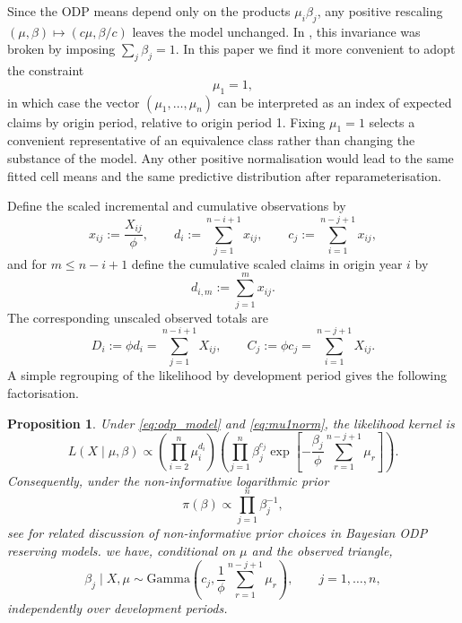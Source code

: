 \documentclass[11pt]{article}
\newtheorem{proposition}[theorem]{Proposition}
\newcommand{\1}{\mathbf{1}}
\newcommand{\GammaD}{\mathrm{Gamma}}
\begin{document}
Since the ODP means depend only on the products $\mu_i\beta_j$, any positive rescaling $(\mu,\beta)\mapsto(c\mu,\beta/c)$ leaves the model unchanged. 
In \citet{Norman2025ODP}, this invariance was broken by imposing $\sum_j{\beta_j}=1$. 
In this paper we find it more convenient to adopt the constraint
\begin{equation}
\mu_1 = 1,
\label{eq:mu1norm}
\end{equation}
in which case the vector $(\mu_1,\dots,\mu_n)$ can be interpreted as an index of expected claims by origin period, relative to origin period 1. 
Fixing $\mu_1=1$ selects a convenient representative of an equivalence class rather than changing the substance of the model. Any other positive normalisation would lead to the same fitted cell means and the same predictive distribution after reparameterisation. 

Define the scaled incremental and cumulative observations by
\begin{equation}
x_{ij} := \frac{X_{ij}}{\phi},
\qquad
d_i := \sum_{j=1}^{n-i+1} x_{ij},
\qquad
c_j := \sum_{i=1}^{n-j+1} x_{ij},
\label{eq:scaled_counts}
\end{equation}
and for $m\le n-i+1$ define the cumulative scaled claims in origin year $i$ by
\begin{equation}
d_{i,m} := \sum_{j=1}^{m} x_{ij}.
\end{equation}
The corresponding unscaled observed totals are
\begin{equation}
D_i:=\phi d_i=\sum_{j=1}^{n-i+1}X_{ij},
\qquad
C_j:=\phi c_j=\sum_{i=1}^{n-j+1}X_{ij}.
\label{eq:unscaled_totals}
\end{equation}
A simple regrouping of the likelihood by development period gives the following factorisation.

\begin{proposition}\label{prop:likelihood_factorisation}
Under \eqref{eq:odp_model} and \eqref{eq:mu1norm}, the likelihood kernel is
\begin{equation}
L(X\mid \mu,\beta)
\propto
\left(\prod_{i=2}^{n} \mu_i^{d_i}\right)
\left(\prod_{j=1}^{n} \beta_j^{c_j}
\exp\!\left[-\frac{\beta_j}{\phi}\sum_{r=1}^{n-j+1} \mu_r\right]\right).
\label{eq:likelihood_factorisation}
\end{equation}
Consequently, under the non-informative logarithmic prior
\begin{equation}
\pi(\beta)\propto \prod_{j=1}^{n}\beta_j^{-1},
\label{eq:beta_log_prior}
\end{equation}
see \citet{Wuthrich2013} for related discussion of non-informative prior choices in Bayesian ODP reserving models.
we have, conditional on $\mu$ and the observed triangle,
\begin{equation}
\beta_j\mid X,\mu \sim \GammaD\!\left(c_j,\frac{1}{\phi}\sum_{r=1}^{n-j+1} \mu_r\right),
\qquad j=1,\dots,n,
\label{eq:beta_post_conditional}
\end{equation}
independently over development periods.
\end{proposition}
\end{document}
